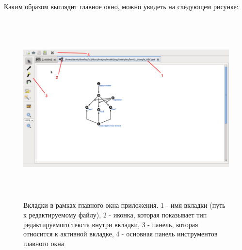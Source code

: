 Каким образом выглядит главное окно, можно увидеть на следующем рисунке:
\begin{figure}[h]
	\includegraphics[width=16.23cm, height=9.82cm]{../images/tabs.png}
	\caption{Вкладки в рамках главного окна приложения. 1 - имя вкладки (путь к редактируемому файлу), 2 - иконка, которая показывает
	тип редактируемого текста внутри вкладки, 3 - панель, которая относится к активной вкладке, 4 - основная панель инструментов главного окна}
	\label{pic_tabs}
\end{figure}




